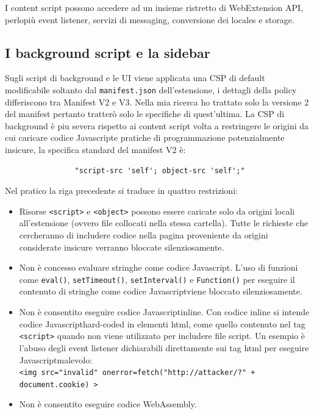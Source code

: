 \documentclass{sapthesis}
\newcommand{\code}[1]{\texttt{#1}}
\newcommand{\JS}{Javascript}
\newcommand{\manifest}{\code{manifest.json} }
\begin{document}
            I content script possono accedere ad un insieme ristretto di WebExtension API, perlopiù event listener,
            servizi di messaging, conversione dei locales e storage.

        \subsection{I background script e la sidebar}
        \label{sec:difese-background-sidebar}
            Sugli script di background e le UI viene applicata una CSP di default modificabile soltanto dal
            \manifest dell'estensione, i dettagli della policy differiscono tra Manifest V2 e V3. Nella
            mia ricerca ho trattato solo la versione 2 del manifest pertanto tratterò solo le specifiche
            di quest'ultima.
            La CSP di background è piu severa rispetto ai content script volta a restringere le origini
            da cui caricare codice \JS e pratiche di programmazione potenzialmente insicure, la specifica
            standard del manifest V2 è:
            \begin{lstlisting}
                "script-src 'self'; object-src 'self';"
            \end{lstlisting}
            Nel pratico la riga precedente si traduce in quattro restrizioni:
            \begin{itemize}
                \item Risorse \code{<script>} e \code{<object>} possono essere caricate solo da origini
                        locali all'estensione (ovvero file collocati nella stessa cartella). Tutte le
                        richieste che cercheranno di includere codice nella pagina proveniente da origini
                        considerate insicure verranno bloccate silenziosamente.

                \item Non è concesso evaluare stringhe come codice \JS. L'uso di funzioni come
                        \code{eval()}, \code{setTimeout()}, \code{setInterval()} e \code{Function()}
                        per eseguire il contenuto di stringhe come codice \JS viene bloccato silenziosamente.
                
                \item Non è consentito eseguire codice \JS inline. Con codice inline si intende codice
                        \JS hard-coded in elementi html, come quello contenuto nel tag \code{<script>}
                        quando non viene utilizzato per includere file script. Un esempio è l'abuso degli
                        event listener dichiarabili direttamente sui tag html per eseguire \JS malevolo:\\
                        \code{<img src="invalid" onerror=fetch("http://attacker/?" + document.cookie) >}        

                \item {} Non è consentito eseguire codice WebAssembly.
            
            \end{itemize}
\end{document}
